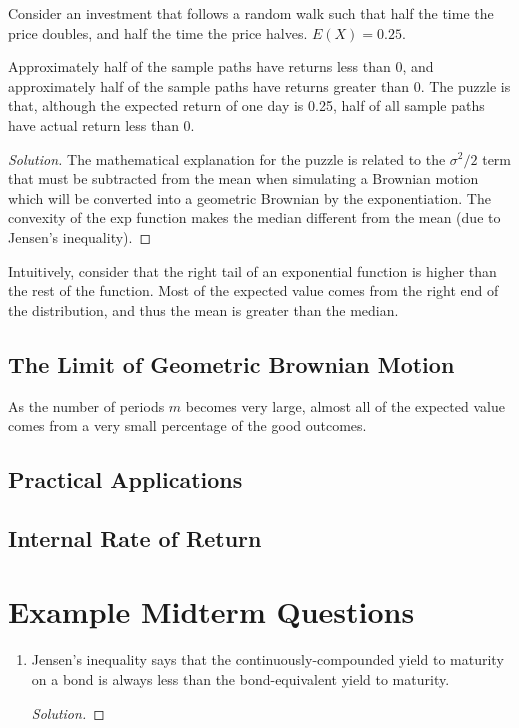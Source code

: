 \documentclass[12pt]{scrartcl}
\begin{document}
\begin{example}
    Consider an investment that follows a random walk such that half the time the price doubles, and half the time the price halves. $E(X) = 0.25$. 

    Approximately half of the sample paths have returns less than 0, and approximately half of the sample paths have returns greater than 0. The puzzle is that, although the expected return of one day is 0.25, half of all sample paths have actual return less than 0.

    \begin{proof}[Solution]
        The mathematical explanation for the puzzle is related to the  $\sigma^2/2$
  term that must be subtracted from the mean when simulating a Brownian motion which will be converted into a geometric Brownian by the exponentiation. The convexity of the exp
  function makes the median different from the mean (due to Jensen's inequality).
    \end{proof}

    Intuitively, consider that the right tail of an exponential function is higher than the rest of the function. Most of the expected value comes from the right end of the distribution, and thus the mean is greater than the median. 
\end{example}

\subsection{The Limit of Geometric Brownian Motion}

As the number of periods $m$ becomes very large, almost all of the expected value comes from a very small percentage of the good outcomes.

\subsection{Practical Applications}

\subsection{Internal Rate of Return}

\section{Example Midterm Questions}

\begin{enumerate}
    \item Jensen’s inequality says that the continuously-compounded yield to maturity on a bond is always less than the bond-equivalent yield to maturity.
\begin{proof}[Solution]
    
\end{proof}
\end{enumerate}
\end{document}
